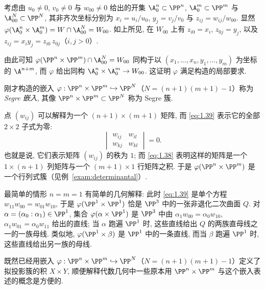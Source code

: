 考虑由 $u_0 \ne 0$, $v_0 \ne 0$ 与 $w_{00} \ne 0$ 给出的开集 $\A^n_0 \subset \PP^n$, $\A^m_0 \subset \PP^m$ 与 $\A^N_{00} \subset \PP^N$, 其非齐次坐标分别为 $x_i = u_i/u_0$, $y_j = v_j/v_0$ 与 $z_{ij} = w_{ij}/w_{00}$. 显然 $\varphi(\A^n_0 \times \A^m_0) = W \cap \A^N_{00} = W_{00}$. 如上所见, 在 $W_{00}$ 上有 $z_{i0} = x_i$, $z_{0j} = y_j$, 以及 $z_{ij} = x_i y_j = z_{i0}\, z_{0j}$（$i, j > 0$）.

由此可知 $\varphi(\PP^n \times \PP^m) \cap \A^N_{00} = W_{00}$ 同构于以 $(x_1, \ldots, x_n, y_1, \ldots, y_m)$ 为坐标的 $\A^{n+m}$, 而 $\varphi$ 给出同构 $\A^n_0 \times \A^m_0 \to W_{00}$. 这证明 $\varphi$ 满足构造的局部要求.

\begin{definition}[Segre 嵌入]\label{def:segre}
	刚才构造的嵌入 $\varphi: \PP^n \times \PP^m \hookrightarrow \PP^N$（$N = (n+1)(m+1) - 1$）称为 \emph{Segre 嵌入}, 其像 $\PP^n \times \PP^m \subset \PP^N$ 称为 Segre 簇.
\end{definition}

\begin{remark}\label{rem:segre-matrix}
	点 $(w_{ij})$ 可以解释为一个 $(n+1) \times (m+1)$ 矩阵, 而 \eqref{eq:1.39} 表示它的全部 $2 \times 2$ 子式为零:
	\[
		\begin{vmatrix} w_{ij} & w_{il} \\ w_{kj} & w_{kl} \end{vmatrix} = 0.
	\]
	也就是说, 它们表示矩阵 $(w_{ij})$ 的秩为 $1$; 而 \eqref{eq:1.38} 表明这样的矩阵是一个 $1 \times (n+1)$ 列矩阵与一个 $(m+1) \times 1$ 行矩阵之积. 于是 $\varphi(\PP^n \times \PP^m)$ 是一个行列式簇（见例~\ref{exam:determinantal}）.
\end{remark}

\begin{remark}\label{rem:segre-quadric}
	最简单的情形 $n = m = 1$ 有简单的几何解释: 此时 \eqref{eq:1.39} 是单个方程 $w_{11} w_{00} = w_{01} w_{10}$, 于是 $\varphi(\PP^1 \times \PP^1)$ 恰是 $\PP^3$ 中的一张非退化二次曲面 $Q$. 对 $\alpha = (\alpha_0 : \alpha_1) \in \PP^1$, 集合 $\varphi(\alpha \times \PP^1)$ 是 $\PP^3$ 中由 $\alpha_1 w_{00} = \alpha_0 w_{10}$, $\alpha_1 w_{01} = \alpha_0 w_{11}$ 给出的直线; 当 $\alpha$ 跑遍 $\PP^1$ 时, 这些直线给出 $Q$ 的两族直母线之一的一族母线. 类似地, $\varphi(\PP^1 \times \beta)$ 是 $\PP^1$ 中的一条直线, 而当 $\beta$ 跑遍 $\PP^1$ 时, 这些直线给出另一族的母线.
\end{remark}

既然已经用嵌入 $\varphi: \PP^n \times \PP^m \hookrightarrow \PP^N$（$N = (n+1)(m+1)-1$）定义了拟投影簇的积 $X \times Y$, 顺便解释代数几何中一些原本用 $\PP^n \times \PP^m$ 与这个嵌入表述的概念是方便的.

